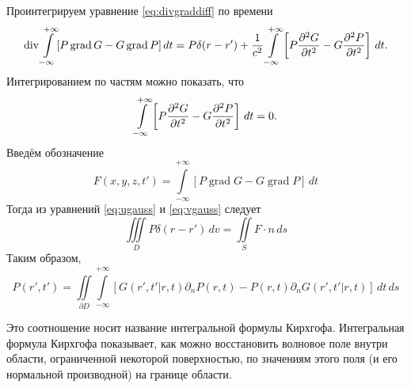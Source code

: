 \documentclass[a4paper, fontsize=14pt]{article}
\newcommand{\divop}{\operatorname{div}}
\newcommand{\gradop}{\operatorname{grad}}
\begin{document}
	Проинтегрируем уравнение \ref{eq:divgraddiff} по времени
	\begin{equation}
		\divop \int\limits_{-\infty}^{+\infty} [P \gradop G - G \gradop P ]\, dt=  P\delta(r-r') +\frac{1}{c^2}\int\limits_{-\infty}^{+\infty}\left[P\diff[2]{G}{t} - G \diff[2]{P}{t}\right]\,dt.
		\label{eq:ugauss}
	\end{equation}
	Интегрированием по частям можно показать, что 
	$$
	\int\limits_{-\infty}^{+\infty}\left[P\diff[2]{G}{t} - G \diff[2]{P}{t}\right]\,dt = 0.
	$$
	Введём обозначение 
	$$
		F(x,y,z,t') = \int\limits_{-\infty}^{+\infty} [P \gradop G - G \gradop P ]\, dt
	$$
	Тогда из уравнений \ref{eq:ugauss} и \ref{eq:vgauss} следует
	\begin{equation}
		\iiint\limits_D P\delta(r-r') \, dv = \iint\limits_S F \cdot n \, ds 
	\end{equation}
Таким образом, 
	\begin{equation}
		P(r',t') = \iint\limits_{\partial D} \int\limits_{-\infty}^{+\infty} 
	[G(r',t'|r,t)\partial_n P(r,t) 
	- P(r,t)\partial_n G(r',t'|r,t)] \,dt\,ds
	\label{eq:kir}
	\end{equation}
	
	
	Это соотношение носит название интегральной формулы Кирхгофа.
	Интегральная
	формула Кирхгофа показывает, как можно восстановить волновое поле внутри области,
	ограниченной некоторой поверхностью, по значениям этого поля (и его нормальной
	производной) на границе области.

\end{document}
